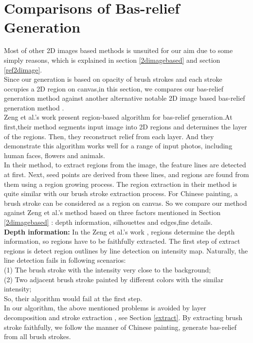 \section{Comparisons of Bas-relief Generation}\label{compare}
Most of other 2D images based methods is unsuited for our aim due to some simply reasons, which is explained in section \ref{2dimagebased} and section \ref{ref2dimage}.\\
Since our generation is based on opacity of brush strokes and each stroke occupies a 2D region on canvas,in this section, we compares our bas-relief generation method against another alternative notable 2D image based bas-relief generation method \cite{zeng2014region}. \\
Zeng et al.'s work \cite{zeng2014region} present region-based algorithm for bas-relief generation.At first,their method segments input image into 2D regions and determines the layer of the regions. Then, they reconstruct relief from each layer. And they demonstrate this algorithm works well for a range of input photos, including human faces, flowers and animals.\\
In their method, to extract regions from the image, the feature lines are detected at first. Next, seed points are derived from these lines, and regions are found from them using a region growing process. The region extraction in their method is quite similar with our brush stroke extraction process. For Chinese painting, a brush stroke can be considered as a region on canvas. So we compare our method against Zeng et al.'s method \cite{zeng2014region} based on three factors mentioned in Section \ref{2dimagebased} : depth information, silhouettes and edges,fine details. \\
\textbf{Depth information:} In the Zeng et al.'s work \cite{zeng2014region} , regions determine the depth information, so regions have to be faithfully extracted. The first step of extract regions is detect region outlines by line detection on intensity map. Naturally, the line detection fails in following scenarios: \\
(1) The brush stroke with the intensity very close to the background; \\
(2) Two adjacent brush stroke painted by different colors with the similar intensity;\\
So, their algorithm would fail at the first step.\\
In our algorithm, the above mentioned problems is avoided by layer decomposition and stroke extraction , see Section \ref{extract}. By extracting brush stroke faithfully, we follow the manner of Chinese painting, generate bas-relief from all brush strokes. \\
